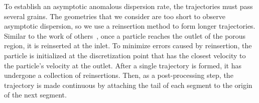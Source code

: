 \documentclass{jfm}
\begin{document}
To establish an asymptotic anomalous dispersion rate, the trajectories
must pass several grains. The geometries that we consider are too short
to observe asymptotic dispersion, so we use a reinsertion method to form
longer trajectories. Similar to the work of
others~\citep{dea-qua-bir-jua2018, puy-gou-den2019}, once a particle
reaches the outlet of the porous region, it is reinserted at the inlet.
To minimize errors caused by reinsertion, the particle is initialized at
the discretization point that has the closest velocity to the particle's
velocity at the outlet.  After a single trajectory is formed, it has
undergone a collection of reinsertions.  Then, as a post-processing
step, the trajectory is made continuous by attaching the tail of each
segment to the origin of the next segment.


\end{document}
